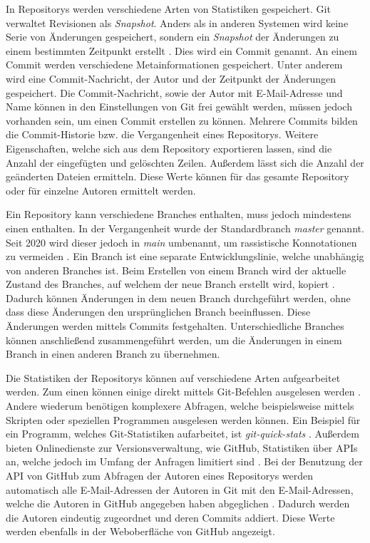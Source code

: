 In Repositorys werden verschiedene Arten von Statistiken gespeichert.
Git verwaltet Revisionen als \emph{Snapshot}.
Anders als in anderen Systemen wird keine Serie von Änderungen gespeichert, sondern ein \emph{Snapshot} der Änderungen zu einem bestimmten Zeitpunkt erstellt \autocite{ponuthorai_version_2022}.
Dies wird ein Commit genannt.
An einem Commit werden verschiedene Metainformationen gespeichert.
Unter anderem wird eine Commit-Nachricht, der Autor und der Zeitpunkt der Änderungen gespeichert.
Die Commit-Nachricht, sowie der Autor mit E-Mail-Adresse und Name können in den Einstellungen von Git frei gewählt werden, müssen jedoch vorhanden sein, um einen Commit erstellen zu können.
Mehrere Commits bilden die Commit-Historie bzw. die Vergangenheit eines Repositorys.
Weitere Eigenschaften, welche sich aus dem Repository exportieren lassen, sind die Anzahl der eingefügten und gelöschten Zeilen.
Außerdem lässt sich die Anzahl der geänderten Dateien ermitteln.
Diese Werte können für das gesamte Repository oder für einzelne Autoren ermittelt werden.

Ein Repository kann verschiedene Branches enthalten, muss jedoch mindestens einen enthalten.
In der Vergangenheit wurde der Standardbranch \emph{master} genannt.
Seit 2020 wird dieser jedoch in \emph{main} umbenannt, um rassistische Konnotationen zu vermeiden \autocite{github_githubrenaming_2024}.
Ein Branch ist eine separate Entwicklungslinie, welche unabhängig von anderen Branches ist.
Beim Erstellen von einem Branch wird der aktuelle Zustand des Branches, auf welchem der neue Branch erstellt wird, kopiert \autocite{ponuthorai_version_2022}.
Dadurch können Änderungen in dem neuen Branch durchgeführt werden, ohne dass diese Änderungen den ursprünglichen Branch beeinflussen.
Diese Änderungen werden mittels Commits festgehalten.
Unterschiedliche Branches können anschließend zusammengeführt werden, um die Änderungen in einem Branch in einen anderen Branch zu übernehmen.

Die Statistiken der Repositorys können auf verschiedene Arten aufgearbeitet werden.
Zum einen können einige direkt mittels Git-Befehlen ausgelesen werden \autocite{chacon_git_2024}.
Andere wiederum benötigen komplexere Abfragen, welche beispielsweise mittels Skripten oder speziellen Programmen ausgelesen werden können.
Ein Beispiel für ein Programm, welches Git-Statistiken aufarbeitet, ist \emph{git-quick-stats} \autocite{mestan_git-quick-stats_2024}.
Außerdem bieten Onlinedienste zur Versionsverwaltung, wie GitHub, Statistiken über APIs an, welche jedoch im Umfang der Anfragen limitiert sind \autocite{github_rate_2022}.
Bei der Benutzung der API von GitHub zum Abfragen der Autoren eines Repositorys werden automatisch alle E-Mail-Adressen der Autoren in Git mit den E-Mail-Adressen, welche die Autoren in GitHub angegeben haben abgeglichen \autocite{github_rest-api-endpunkte_2022}.
Dadurch werden die Autoren eindeutig zugeordnet und deren Commits addiert.
Diese Werte werden ebenfalls in der Weboberfläche von GitHub angezeigt.

